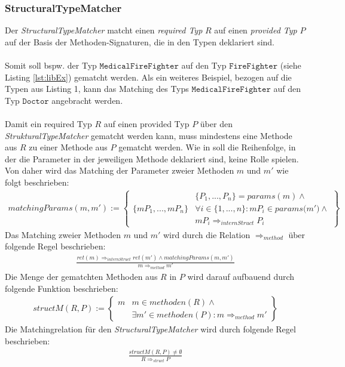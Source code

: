\subsubsection{StructuralTypeMatcher} \label{subsec_structmatcher}
Der \emph{StructuralTypeMatcher} matcht einen \emph{required Typ} $R$ auf einen \emph{provided Typ} $P$ auf der Basis der Methoden-Signaturen, die in den Typen deklariert sind.
\\\\
Somit soll bspw. der Typ $\texttt{MedicalFireFighter}$ auf den Typ $\texttt{FireFighter}$ (siehe Listing \ref{lst:libEx}) gematcht werden. Als ein weiteres Beispiel, bezogen auf die Typen aus Listing 1, kann das Matching des Typs $\texttt{MedicalFireFighter}$ auf den Typ $\texttt{Doctor}$ angebracht werden.
\\\\
Damit ein required Typ $R$ auf einen provided Typ $P$ über den \emph{StrukturalTypeMatcher} gematcht werden kann, muss mindestens eine Methode aus $R$ zu einer Methode aus $P$ gematcht werden. Wie in \cite{moormann} soll die Reihenfolge, in der die Parameter in der jeweiligen Methode deklariert sind, keine Rolle spielen. Von daher wird das Matching der Parameter zweier Methoden $m$ und $m'$ wie folgt beschrieben:
\begin{gather*}
\mathit{matchingParams(m, m')} :=
\left\{
\begin{array}{l|l}
	&
	\{\mathit{P_1,...,P_n}\} = \mathit{params(m)} \wedge \mathit{ }
	\\
	\{\mathit{mP_1,...,mP_n}\}
	&
	\forall i \in \{1,...,n\}: \mathit{mP_i} \in \mathit{params(m'}) \wedge \mathit{ }
	\\
	&
	\mathit{mP_i} \Rightarrow_{internStruct} \mathit{P_i}
\end{array}
\right\}
\end{gather*}
\noindent
Das Matching zweier Methoden $m$ und $m'$ wird durch die Relation $\Rightarrow_{method}$ über folgende Regel beschrieben:
\begin{gather*}
\frac{\mathit{ret(m)} \Rightarrow_{internStruct} \mathit{ret(m')} \wedge \mathit{matchingParams(m,m')}}{m \Rightarrow_{method} m'}
\end{gather*}
\noindent
Die Menge der gematchten Methoden aus $R$ in $P$ wird darauf aufbauend durch folgende Funktion beschrieben:
\begin{gather*}
structM(R,P) := \left\{ 
				\begin{array}{l|l}
m	& \mathit{m} \in \mathit{methoden(R)} \wedge \mathit{ }
\\
	& \exists \mathit{m'} \in \mathit{methoden(P)} : m \Rightarrow_{method} m'
				\end{array}
              \right\}
\end{gather*}
\noindent
Die Matchingrelation für den \emph{StructuralTypeMatcher} wird durch folgende Regel beschrieben:
\begin{gather*}
\frac{structM(R,P) \neq \emptyset}{R \Rightarrow_{struct}P}
\end{gather*}


